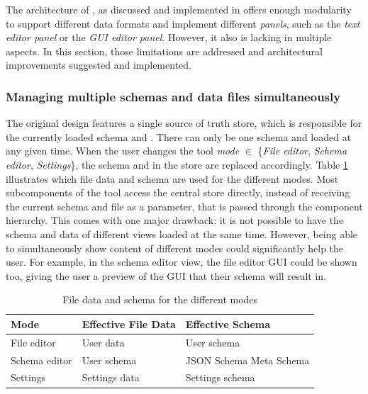 The architecture of \toolname{}, as discussed and implemented in \cite{metaconfigurator} offers enough modularity to support different data formats and implement different \textit{panels}, such as the \textit{text editor panel} or the \textit{GUI editor panel}. 
However, it also is lacking in multiple aspects.
In this section, those limitations are addressed and architectural improvements suggested and implemented.

\subsubsection{Managing multiple schemas and data files simultaneously}
The original design features a single source of truth store, which is responsible for the currently loaded schema and \cfgfile{}. 
There can only be one schema and \cfgfile{} loaded at any given time.
When the user changes the tool \textit{mode} $\in$ \{\textit{File editor}, \textit{Schema editor}, \textit{Settings}\}, the schema and \cfgfile{} in the store are replaced accordingly.
Table \ref{tab:schema_and_file_data_by_mode} illustrates which file data and schema are used for the different modes.
Most subcomponents of the tool access the central store directly, instead of receiving the current schema and file as a parameter, that is passed through the component hierarchy. 
This comes with one major drawback: it is not possible to have the schema and data of different views loaded at the same time.
However, being able to simultaneously show content of different modes could significantly help the user.
For example, in the schema editor view, the file editor GUI could be shown too, giving the user a preview of the GUI that their schema will result in.
\begin{table}[!t]
\caption{File data and schema for the different modes}
\label{tab:schema_and_file_data_by_mode}
\centering
\begin{tabular}{lll}
\toprule
\textbf{Mode} & \textbf{Effective File Data} & \textbf{Effective Schema} \\
\midrule
File editor   & User data                    & User schema               \\
Schema editor & User schema                  & JSON Schema Meta Schema          \\
Settings      & Settings data                & Settings schema           \\
\bottomrule
\end{tabular}
\end{table}

